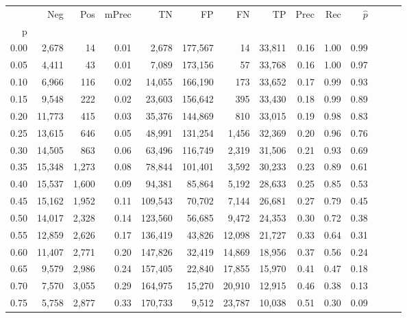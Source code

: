 \begin{tabular}{rrrrrrrrrrrrrr}
\toprule
{} &     Neg &    Pos & mPrec &       TN &       FP &      FN &      TP &  Prec &   Rec & $\hat{p}$ \\
p    &         &        &       &          &          &         &         &       &       &           \\
\midrule
0.00 &   2,678 &     14 &  0.01 &    2,678 &  177,567 &      14 &  33,811 &  0.16 &  1.00 &      0.99 \\
0.05 &   4,411 &     43 &  0.01 &    7,089 &  173,156 &      57 &  33,768 &  0.16 &  1.00 &      0.97 \\
0.10 &   6,966 &    116 &  0.02 &   14,055 &  166,190 &     173 &  33,652 &  0.17 &  0.99 &      0.93 \\
0.15 &   9,548 &    222 &  0.02 &   23,603 &  156,642 &     395 &  33,430 &  0.18 &  0.99 &      0.89 \\
0.20 &  11,773 &    415 &  0.03 &   35,376 &  144,869 &     810 &  33,015 &  0.19 &  0.98 &      0.83 \\
0.25 &  13,615 &    646 &  0.05 &   48,991 &  131,254 &   1,456 &  32,369 &  0.20 &  0.96 &      0.76 \\
0.30 &  14,505 &    863 &  0.06 &   63,496 &  116,749 &   2,319 &  31,506 &  0.21 &  0.93 &      0.69 \\
0.35 &  15,348 &  1,273 &  0.08 &   78,844 &  101,401 &   3,592 &  30,233 &  0.23 &  0.89 &      0.61 \\
0.40 &  15,537 &  1,600 &  0.09 &   94,381 &   85,864 &   5,192 &  28,633 &  0.25 &  0.85 &      0.53 \\
0.45 &  15,162 &  1,952 &  0.11 &  109,543 &   70,702 &   7,144 &  26,681 &  0.27 &  0.79 &      0.45 \\
0.50 &  14,017 &  2,328 &  0.14 &  123,560 &   56,685 &   9,472 &  24,353 &  0.30 &  0.72 &      0.38 \\
0.55 &  12,859 &  2,626 &  0.17 &  136,419 &   43,826 &  12,098 &  21,727 &  0.33 &  0.64 &      0.31 \\
0.60 &  11,407 &  2,771 &  0.20 &  147,826 &   32,419 &  14,869 &  18,956 &  0.37 &  0.56 &      0.24 \\
0.65 &   9,579 &  2,986 &  0.24 &  157,405 &   22,840 &  17,855 &  15,970 &  0.41 &  0.47 &      0.18 \\
0.70 &   7,570 &  3,055 &  0.29 &  164,975 &   15,270 &  20,910 &  12,915 &  0.46 &  0.38 &      0.13 \\
0.75 &   5,758 &  2,877 &  0.33 &  170,733 &    9,512 &  23,787 &  10,038 &  0.51 &  0.30 &      0.09 \\

\end{tabular}

